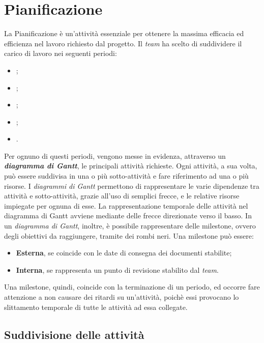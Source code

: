 \newpage

\section{Pianificazione}
La Pianificazione è un'attività essenziale per ottenere la massima efficacia ed efficienza nel lavoro richiesto dal progetto. Il \textit{team} \textit{\gruppo} ha scelto di suddividere il carico di lavoro nei seguenti periodi:
\begin{itemize}
	\item \textbf{\AR};
	\item \textbf{\PA};
	\item \textbf{\PD};
	\item \textbf{\CO};
	\item \textbf{\VV}.
\end{itemize}
Per ognuno di questi periodi, vengono messe in evidenza, attraverso un \textit{\textbf{diagramma di Gantt}}, le principali attività richieste. Ogni attività, a sua volta, può essere suddivisa in una o più sotto-attività e fare riferimento ad una o più risorse. I \textit{diagrammi di Gantt} permettono di rappresentare le varie dipendenze tra attività e sotto-attività, grazie all’uso di semplici frecce, e le relative risorse impiegate per ognuna di esse. La rappresentazione temporale delle attività nel diagramma di Gantt avviene mediante delle frecce direzionate verso il basso. In un \textit{diagramma di Gantt}, inoltre, è possibile rappresentare delle milestone, ovvero degli obiettivi da raggiungere, tramite dei rombi neri. Una milestone può essere:
\begin{itemize}
	\item \textbf{Esterna}, se coincide con le date di consegna dei documenti stabilite;
	\item \textbf{Interna}, se rappresenta un punto di revisione stabilito dal \textit{team}.
\end{itemize}
Una milestone, quindi, coincide con la terminazione di un periodo, ed occorre fare attenzione a non causare dei ritardi su un'attività, poichè essi provocano lo slittamento temporale di tutte le attività ad essa collegate.

	\subsection{Suddivisione delle attività}
